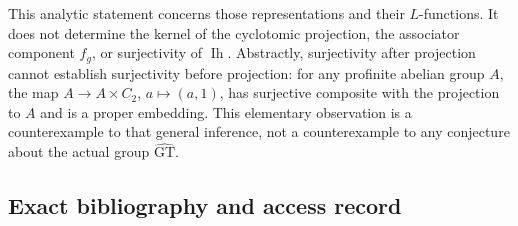\documentclass[11pt,a4paper]{article}
\theoremstyle{definition}\newtheorem{definition}[theorem]{Definition}
\theoremstyle{remark}\newtheorem{remark}[theorem]{Remark}
\begin{document}
This analytic statement concerns those representations and their
\(L\)-functions. It does not determine the kernel of the cyclotomic
projection, the associator component \(f_g\), or surjectivity of
\(\operatorname{Ih}\). Abstractly, surjectivity after projection cannot
establish surjectivity before projection: for any profinite abelian
group \(A\), the map \(A\to A\times C_2\), \(a\mapsto(a,1)\), has
surjective composite with the projection to \(A\) and is a proper
embedding. This elementary observation is a counterexample to that
general inference, not a counterexample to any conjecture about the
actual group \(\widehat{\mathrm{GT}}\).

\subsection{Exact bibliography and access
record}\label{exact-bibliography-and-access-record}
\end{document}
